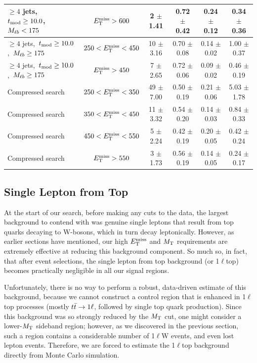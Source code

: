 \begin{table}
\begin{tabular}{|l|c|c|c|c|c|}
 $\ge4$ jets,~$t_\text{mod} \ge10.0$,~$M_{\ell b} <175$      & $E_\text{T}^\text{miss}>600$     & 2 $\pm$ 1.41    & 0.72 $\pm$ 0.42  & 0.24 $\pm$ 0.12 & 0.34 $\pm$ 0.36 \\
\hline
 $\ge4$ jets,~$t_\text{mod} \ge10.0$,~$M_{\ell b} \ge175$    & $250<E_\text{T}^\text{miss}<450$ & 10 $\pm$ 3.16   & 0.70 $\pm$ 0.08  & 0.14 $\pm$ 0.02 & 1.00 $\pm$ 0.37 \\
 $\ge4$ jets,~$t_\text{mod} \ge10.0$,~$M_{\ell b} \ge175$    & $E_\text{T}^\text{miss}>450$     & 7 $\pm$ 2.65    & 0.72 $\pm$ 0.06  & 0.09 $\pm$ 0.02 & 0.46 $\pm$ 0.19 \\
\hline
Compressed search & $250<E_\text{T}^\text{miss}<350$  & 49 $\pm$ 7.00  & 0.50 $\pm$ 0.19  & 0.21 $\pm$ 0.06  & 5.03 $\pm$ 1.78  \\
Compressed search & $350<E_\text{T}^\text{miss}<450$  & 11 $\pm$ 3.32  & 0.54 $\pm$ 0.20  & 0.14 $\pm$ 0.03  & 0.84 $\pm$ 0.33  \\
Compressed search & $450<E_\text{T}^\text{miss}<550$  & 5 $\pm$ 2.24   & 0.42 $\pm$ 0.19  & 0.20 $\pm$ 0.05  & 0.42 $\pm$ 0.24  \\
Compressed search & $E_\text{T}^\text{miss}>550$      & 3 $\pm$ 1.73  & 0.56 $\pm$ 0.19  & 0.14 $\pm$ 0.05  & 0.24 $\pm$ 0.17  \\
\hline
\end{tabular}
\end{table}

\subsection{Single Lepton from Top}
\label{ssec:stop:1ltop}

At the start of our search, before making any cuts to the data, the
largest background to contend with was genuine single leptons that result
from top quarks decaying to W-bosons, which in turn decay
leptonically. However, as earlier sections have mentioned, our high
$E_\text{T}^\text{miss}$ and $M_\text{T}$ requirements are extremely effective at reducing this
background component. So much so, in fact, that after event
selections, the single lepton from top background (or 1$\ell$top) becomes
practically negligible in all our signal regions.

Unfortunately, there is no way to perform a robust, data-driven
estimate of this background, because we cannot construct a control
region that is enhanced in 1$\ell$top processes (mostly $t\bar{t} \rightarrow 1\ell$,
followed by single top quark production). Since this background was so
strongly reduced by the $M_\text{T}$ cut, one might consider a lower-$M_\text{T}$
sideband region; however, as we discovered in the previous section,
such a region contains a considerable number of 1$\ell$W events, and
even lost lepton events. Therefore, we are forced to estimate the
1$\ell$top background directly from Monte Carlo simulation.

